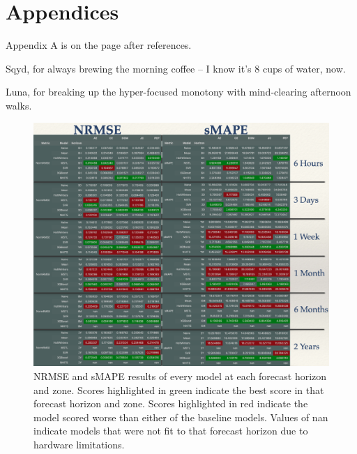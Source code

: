 \documentclass[sigconf]{acmart}
\begin{document}
\section{Appendices}
Appendix A is on the page after references.
\begin{acks}
 \hspace{3mm} Sqyd, for always brewing the morning coffee -- I know it's 8 cups of water, now.

Luna, for breaking up the hyper-focused monotony with mind-clearing afternoon walks.
\end{acks}




\onecolumn

  \begin{figure}[hbt!]
    \includegraphics[width=\textwidth]{Images/Results_Composed.png}
    \caption{NRMSE and sMAPE results of every model at each forecast horizon and zone. Scores highlighted in green indicate the best score in that forecast horizon and zone. Scores highlighted in red indicate the model scored worse than either of the baseline models. Values of nan indicate models that were not fit to that forecast horizon due to hardware limitations.}
    \Description{}
    \label{fig:results}
  \end{figure}
  
\end{document}
